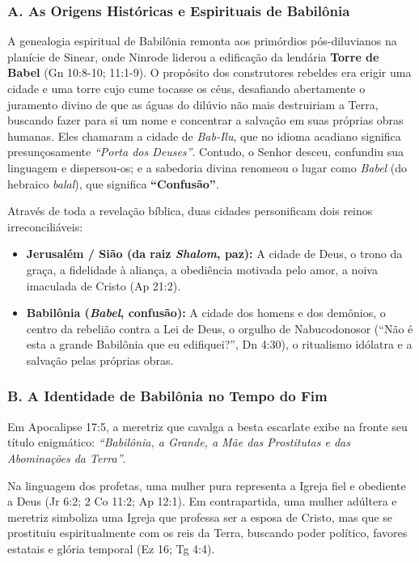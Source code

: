 \documentclass[11pt,a4paper,openany]{book}
\begin{document}
\subsubsection*{A. As Origens Históricas e Espirituais de Babilônia}

A genealogia espiritual de Babilônia remonta aos primórdios pós-diluvianos na planície de Sinear, onde Ninrode liderou a edificação da lendária \textbf{Torre de Babel} (Gn 10:8-10; 11:1-9). O propósito dos construtores rebeldes era erigir uma cidade e uma torre cujo cume tocasse os céus, desafiando abertamente o juramento divino de que as águas do dilúvio não mais destruiriam a Terra, buscando fazer para si um nome e concentrar a salvação em suas próprias obras humanas. Eles chamaram a cidade de \textit{Bab-Ilu}, que no idioma acadiano significa presunçosamente \textit{``Porta dos Deuses''}. Contudo, o Senhor desceu, confundiu sua linguagem e dispersou-os; e a sabedoria divina renomeou o lugar como \textit{Babel} (do hebraico \textit{balal}), que significa \textbf{``Confusão''}.

Através de toda a revelação bíblica, duas cidades personificam dois reinos irreconciliáveis:
\begin{itemize}
  \item \textbf{Jerusalém / Sião (da raiz \textit{Shalom}, paz):} A cidade de Deus, o trono da graça, a fidelidade à aliança, a obediência motivada pelo amor, a noiva imaculada de Cristo (Ap 21:2).
  \item \textbf{Babilônia (\textit{Babel}, confusão):} A cidade dos homens e dos demônios, o centro da rebelião contra a Lei de Deus, o orgulho de Nabucodonosor (``Não é esta a grande Babilônia que eu edifiquei?'', Dn 4:30), o ritualismo idólatra e a salvação pelas próprias obras.
\end{itemize}



\subsubsection*{B. A Identidade de Babilônia no Tempo do Fim}

Em Apocalipse 17:5, a meretriz que cavalga a besta escarlate exibe na fronte seu título enigmático: \textit{``Babilônia, a Grande, a Mãe das Prostitutas e das Abominações da Terra''}.

Na linguagem dos profetas, uma mulher pura representa a Igreja fiel e obediente a Deus (Jr 6:2; 2 Co 11:2; Ap 12:1). Em contrapartida, uma mulher adúltera e meretriz simboliza uma Igreja que professa ser a esposa de Cristo, mas que se prostituiu espiritualmente com os reis da Terra, buscando poder político, favores estatais e glória temporal (Ez 16; Tg 4:4).
\end{document}
